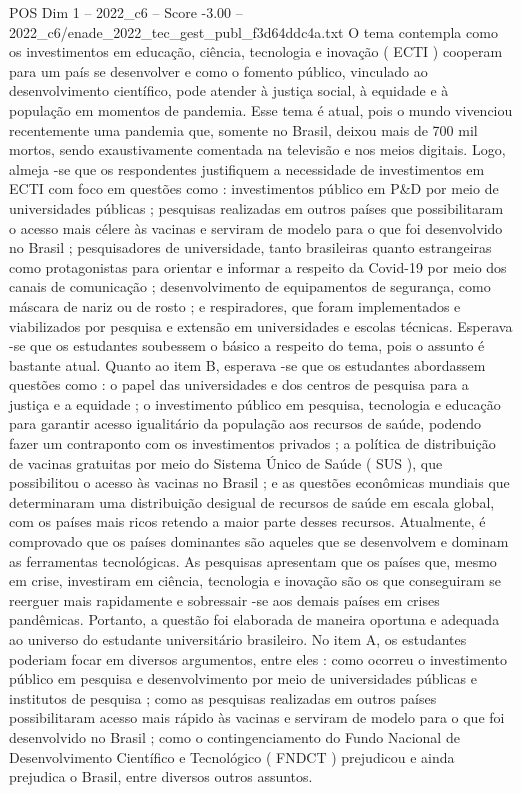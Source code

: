 \begin{textsample}{POS Dim 1 – 2022\_c6 – Score -3.00 – 2022\_c6/enade\_2022\_tec\_gest\_publ\_f3d64ddc4a.txt}
O tema contempla como os investimentos em educação, ciência, tecnologia e inovação ( ECTI ) cooperam para um país se desenvolver e como o fomento público, vinculado ao desenvolvimento científico, pode atender à justiça social, à equidade e à população em momentos de pandemia.
Esse tema é atual, pois o mundo vivenciou recentemente uma pandemia que, somente no Brasil, deixou mais de 700 mil mortos, sendo exaustivamente comentada na televisão e nos meios digitais.
Logo, almeja -se que os respondentes justifiquem a necessidade de investimentos em ECTI com foco em questões como : investimentos público em P\&D por meio de universidades públicas ; pesquisas realizadas em outros países que possibilitaram o acesso mais célere às vacinas e serviram de modelo para o que foi desenvolvido no Brasil ; pesquisadores de universidade, tanto brasileiras quanto estrangeiras como protagonistas para orientar e informar a respeito da Covid-19 por meio dos canais de comunicação ; desenvolvimento de equipamentos de segurança, como máscara de nariz ou de rosto ; e respiradores, que foram implementados e viabilizados por pesquisa e extensão em universidades e escolas técnicas.
Esperava -se que os estudantes soubessem o básico a respeito do tema, pois o assunto é bastante atual.
Quanto ao item B, esperava -se que os estudantes abordassem questões como : o papel das universidades e dos centros de pesquisa para a justiça e a equidade ; o investimento público em pesquisa, tecnologia e educação para garantir acesso igualitário da população aos recursos de saúde, podendo fazer um contraponto com os investimentos privados ; a política de distribuição de vacinas gratuitas por meio do Sistema Único de Saúde ( SUS ), que possibilitou o acesso às vacinas no Brasil ; e as questões econômicas mundiais que determinaram uma distribuição desigual de recursos de saúde em escala global, com os países mais ricos retendo a maior parte desses recursos.
Atualmente, é comprovado que os países dominantes são aqueles que se desenvolvem e dominam as ferramentas tecnológicas.
As pesquisas apresentam que os países que, mesmo em crise, investiram em ciência, tecnologia e inovação são os que conseguiram se reerguer mais rapidamente e sobressair -se aos demais países em crises pandêmicas.
Portanto, a questão foi elaborada de maneira oportuna e adequada ao universo do estudante universitário brasileiro.
No item A, os estudantes poderiam focar em diversos argumentos, entre eles : como ocorreu o investimento público em pesquisa e desenvolvimento por meio de universidades públicas e institutos de pesquisa ; como as pesquisas realizadas em outros países possibilitaram acesso mais rápido às vacinas e serviram de modelo para o que foi desenvolvido no Brasil ; como o contingenciamento do Fundo Nacional de Desenvolvimento Científico e Tecnológico ( FNDCT ) prejudicou e ainda prejudica o Brasil, entre diversos outros assuntos.

\end{textsample}
